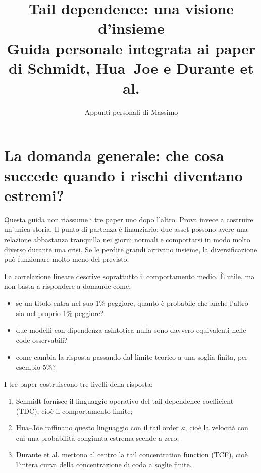 \documentclass[11pt,a4paper]{article}
\title{Tail dependence: una visione d'insieme\\
\large Guida personale integrata ai paper di Schmidt, Hua--Joe e Durante et al.}
\author{Appunti personali di Massimo}
\date{}
\begin{document}
\maketitle
\tableofcontents
\newpage

\section{La domanda generale: che cosa succede quando i rischi diventano estremi?}

Questa guida non riassume i tre paper uno dopo l'altro. Prova invece a
costruire un'unica storia. Il punto di partenza è finanziario: due asset possono
avere una relazione abbastanza tranquilla nei giorni normali e comportarsi in
modo molto diverso durante una crisi. Se le perdite grandi arrivano insieme,
la diversificazione può funzionare molto meno del previsto.

La correlazione lineare descrive soprattutto il comportamento medio. È utile,
ma non basta a rispondere a domande come:
\begin{itemize}
  \item se un titolo entra nel suo 1\% peggiore, quanto è probabile che anche
  l'altro sia nel proprio 1\% peggiore?
  \item due modelli con dipendenza asintotica nulla sono davvero equivalenti
  nelle code osservabili?
  \item come cambia la risposta passando dal limite teorico a una soglia
  finita, per esempio 5\%?
\end{itemize}

I tre paper costruiscono tre livelli della risposta:
\begin{enumerate}
  \item Schmidt fornisce il linguaggio operativo del tail-dependence
  coefficient (TDC), cioè il comportamento limite;
  \item Hua--Joe raffinano questo linguaggio con il tail order $\kappa$, cioè
  la velocità con cui una probabilità congiunta estrema scende a zero;
  \item Durante et al. mettono al centro la tail concentration function (TCF),
  cioè l'intera curva della concentrazione di coda a soglie finite.
\end{enumerate}
\end{document}
